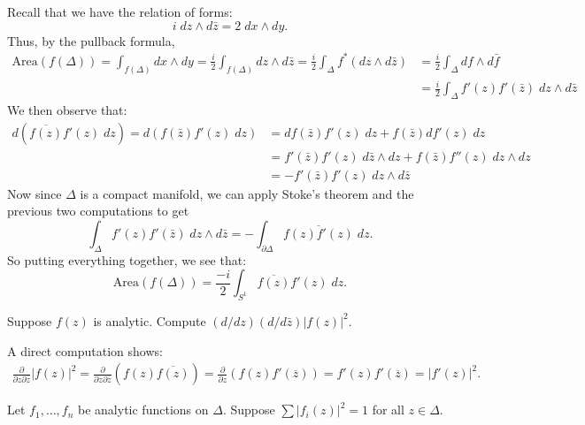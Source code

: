 \documentclass{pset}
\begin{document}
\begin{solution}
    Recall that we have the relation of forms:
    \[
        i\;dz\wedge d\bar{z} = 2\;dx\wedge dy
    .\] 
    Thus, by the pullback formula,
    \[
        \begin{aligned}
            \textrm{Area}(f(\Delta)) = \int_{f(\Delta)} dx\wedge dy = \frac{i}{2}\int_{f(\Delta)}dz\wedge d\bar{z} = \frac{i}{2}\int_{\Delta} f^*(dz\wedge d\bar{z}) &= \frac{i}{2}\int_{\Delta} df\wedge d\bar{f}\\
            &= \frac{i}{2}\int_\Delta f'(z)f'(\bar{z})\;dz\wedge d\bar{z}
        \end{aligned} 
    \] 
    We then observe that:
    \[
        \begin{aligned}
            d(\overline{f(z)}f'(z)\;dz) = d\left(f(\bar{z})f'(z)\;dz\right) &= df(\bar{z})f'(z)\;dz + f(\bar{z})df'(z)\;dz\\
            &= f'(\bar{z})f'(z)\;d\bar{z}\wedge dz + f(\bar{z})f''(z)\;dz\wedge dz\\
            &= -f'(\bar{z})f'(z)\;dz\wedge d\bar{z}
        \end{aligned}
    \] 
    Now since $\Delta$ is a compact manifold, we can apply Stoke's theorem and the previous two computations to get
    \[
        \int_\Delta f'(z)f'(\bar{z})\;dz\wedge d\bar{z} = -\int_{\partial \Delta} \overline{f(z)f'(z)}\;dz
    .\] 
    So putting everything together, we see that:
    \[
        \textrm{Area}(f(\Delta)) = \frac{-i}{2}\int_{S^1}\overline{f(z)}f'(z)\;dz
    .\] 
\end{solution}

\begin{problem}{5}
    Suppose $f(z)$ is analytic. Compute $(d/dz)(d /d\bar{z})|f(z)|^2$.
\end{problem}

\begin{solution}
    A direct computation shows:
    \[
        \begin{aligned}
            \frac{\partial}{\partial z\partial \bar{z}}|f(z)|^2 = 
            \frac{\partial}{\partial z\partial\bar{z}}\left(f(z)\overline{f(z)}\right)=\frac{\partial}{\partial z}\left(f(z)f'(\overline{z})\right) = f'(z)f'(\overline{z})=|f'(z)|^2.
        \end{aligned}
    \] 
\end{solution}

\begin{problem}{7}
    Let $f_1,\ldots,f_n$ be analytic functions on $\Delta$. Suppose $\sum |f_i(z)|^2=1$ for all $z\in \Delta$.
\end{problem}
\end{document}

